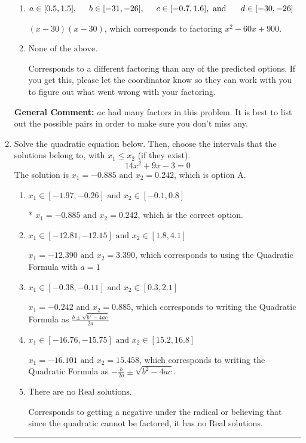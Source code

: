 \documentclass{extbook}[14pt]
\newcommand{\litem}[1]{\item #1

\rule{\textwidth}{0.4pt}}
\begin{document}
\begin{enumerate}
{\begin{enumerate}[label=\Alph*.]
* $(6x -5)(6x -5)$, which is the correct option.
\item \( a \in [0.5, 1.5], \hspace*{5mm} b \in [-31, -26], \hspace*{5mm} c \in [-0.7, 1.6], \text{ and } \hspace*{5mm} d \in [-30, -26] \)

 $(x -30)(x -30)$, which corresponds to factoring $x^{2} -60 x + 900$.
\item \( \text{None of the above.} \)

 Corresponds to a different factoring than any of the predicted options. If you get this, please let the coordinator know so they can work with you to figure out what went wrong with your factoring.
\end{enumerate}

\textbf{General Comment:} $ac$ had many factors in this problem. It is best to list out the possible pairs in order to make sure you don't miss any.
}
\litem{
Solve the quadratic equation below. Then, choose the intervals that the solutions belong to, with $x_1 \leq x_2$ (if they exist).
\[ 14x^{2} +9 x -3 = 0 \]The solution is \( x_1 = -0.885 \text{ and } x_2 = 0.242 \), which is option A.\begin{enumerate}[label=\Alph*.]
\item \( x_1 \in [-1.97, -0.26] \text{ and } x_2 \in [-0.1, 0.8] \)

* $x_1 = -0.885 \text{ and } x_2 = 0.242$, which is the correct option.
\item \( x_1 \in [-12.81, -12.15] \text{ and } x_2 \in [1.8, 4.1] \)

 $x_1 = -12.390 \text{ and } x_2 = 3.390$, which corresponds to using the Quadratic Formula with $a=1$
\item \( x_1 \in [-0.38, -0.11] \text{ and } x_2 \in [0.3, 2.1] \)

 $x_1 = -0.242 \text{ and } x_2 = 0.885$, which corresponds to writing the Quadratic Formula as $\frac{b \pm \sqrt{b^2 - 4ac}}{2a}$
\item \( x_1 \in [-16.76, -15.75] \text{ and } x_2 \in [15.2, 16.8] \)

 $x_1 = -16.101 \text{ and } x_2 = 15.458$, which corresponds to writing the Quadratic Formula as $-\frac{b}{2a} \pm \sqrt{b^2 - 4ac}$.
\item \( \text{There are no Real solutions.} \)

Corresponds to getting a negative under the radical or believing that since the quadratic cannot be factored, it has no Real solutions.
\end{enumerate}

}
\end{enumerate}
\end{document}
